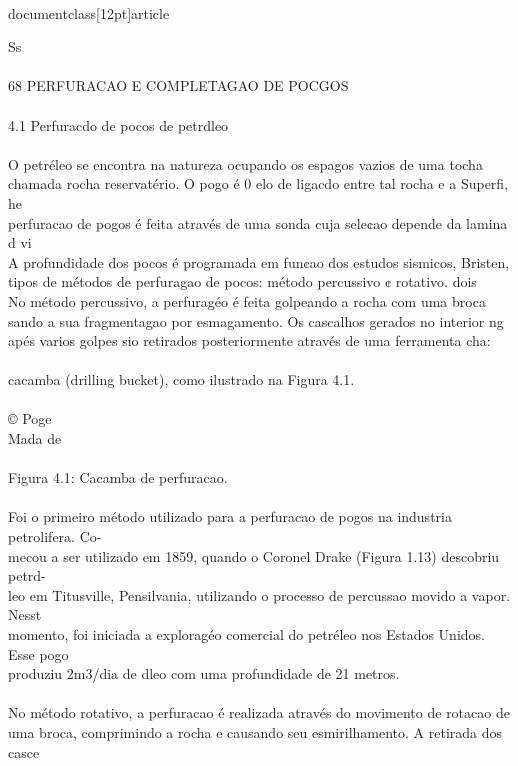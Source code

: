 \\documentclass[12pt]{article}
\begin{document}
{Ss\\
\\
68 PERFURACAO E COMPLETAGAO DE POCGOS\\
\\
4.1 Perfuracdo de pocos de petrdleo\\
\\
O petréleo se encontra na natureza ocupando os espagos vazios de uma tocha\\
chamada rocha reservatério. O pogo é 0 elo de ligacdo entre tal rocha e a Superfi, he\\
perfuracao de pogos é feita através de uma sonda cuja sele¢ao depende da lamina d vi\\
A profundidade dos pocos é programada em fun¢ao dos estudos sismicos, Bristen,\\
tipos de métodos de perfuragao de pocos: método percussivo ¢ rotativo. dois\\
No método percussivo, a perfuragéo é feita golpeando a rocha com uma broca\\
sando a sua fragmentagao por esmagamento. Os cascalhos gerados no interior ng\\
apés varios golpes sio retirados posteriormente através de uma ferramenta cha:\\
\\
cacamba (drilling bucket), como ilustrado na Figura 4.1.\\
\\
© Poge\\
Mada de\\
\\
Figura 4.1: Cacamba de perfuracao.\\
\\
Foi o primeiro método utilizado para a perfuracao de pogos na industria petrolifera. Co-\\
mecou a ser utilizado em 1859, quando o Coronel Drake (Figura 1.13) descobriu petrd-\\
leo em Titusville, Pensilvania, utilizando o processo de percussao movido a vapor. Nesst\\
momento, foi iniciada a exploragéo comercial do petréleo nos Estados Unidos. Esse pogo\\
produziu 2m3/dia de dleo com uma profundidade de 21 metros.\\
\\
No método rotativo, a perfuracao é realizada através do movimento de rotacao de\\
uma broca, comprimindo a rocha e causando seu esmirilhamento. A retirada dos casce\\
}
\end{document}
